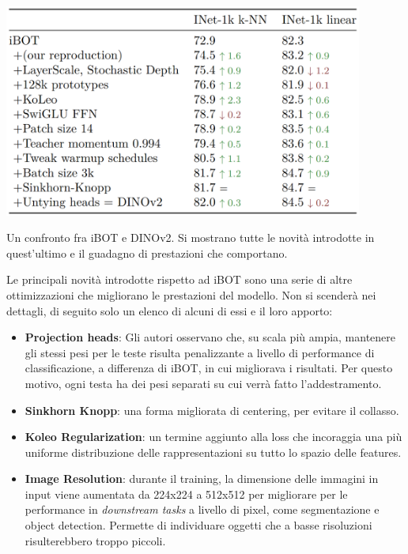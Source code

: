 \begin{table}[t]
    \centering
    \includegraphics[height=70mm]{Immagini/ssl/res_dinov2.png}
    \caption{Un confronto fra iBOT e DINOv2. Si mostrano tutte le novità introdotte in quest'ultimo e il guadagno di prestazioni che comportano.}
    \label{tab:res_dinov2}
\end{table}

Le principali novità introdotte rispetto ad iBOT sono una serie di altre ottimizzazioni che migliorano le prestazioni del modello. Non si scenderà nei dettagli, di seguito solo un elenco di alcuni di essi e il loro apporto:
\begin{itemize}
    \item \textbf{Projection heads}: Gli autori osservano che, su scala più ampia, mantenere gli stessi pesi per le teste risulta penalizzante a livello di performance di classificazione, a differenza di iBOT, in cui migliorava i risultati. Per questo motivo, ogni testa ha dei pesi separati su cui verrà fatto l'addestramento.
    \item \textbf{Sinkhorn Knopp}: una forma migliorata di centering, per evitare il collasso.
    \item \textbf{Koleo Regularization}: un termine aggiunto alla loss che incoraggia una più uniforme distribuzione delle rappresentazioni su tutto lo spazio delle features.
    \item \textbf{Image Resolution}: durante il training, la dimensione delle immagini in input viene aumentata da 224x224 a 512x512 per migliorare per le performance in \textit{downstream tasks} a livello di pixel, come segmentazione e object detection. Permette di individuare oggetti che a basse risoluzioni risulterebbero troppo piccoli. 
\end{itemize}


